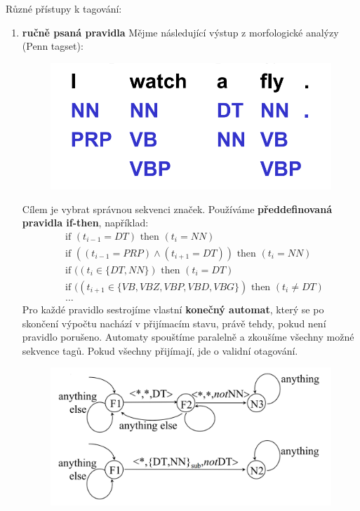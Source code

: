 \documentclass[11pt]{report} %
\numberwithin{equation}{section}
\begin{document}
Různé přístupy k tagování:
\begin{enumerate}
	\item \textbf{ručně psaná pravidla} Mějme následující výstup z morfologické analýzy (Penn tagset):
	\begin{figure}[H]
		\centering
		\includegraphics[scale=1]{img/tag1.png}
	\end{figure}
	Cílem je vybrat správnou sekvenci značek. Používáme \textbf{předdefinovaná pravidla if-then}, například:
		\begin{align*}
			&\text{if }(t_{i-1} = DT)\text{ then }(t_i = NN)\\
			&\text{if }((t_{i-1} = PRP) \wedge (t_{i+1} = DT))\text{ then }(t_i = NN)\\
			&\text{if }((t_{i} \in \{DT,NN\})\text{ then }(t_i = DT)\\
			&\text{if }((t_{i+1} \in \{VB,VBZ,VBP,VBD,VBG\})\text{ then }(t_i \neq DT)\\
			&\dots
		\end{align*}
	Pro každé pravidlo sestrojíme vlastní \textbf{konečný automat}, který se po skončení výpočtu nachází v přijímacím stavu, právě tehdy, pokud není pravidlo porušeno. Automaty spouštíme paralelně a zkoušíme všechny možné sekvence tagů. Pokud všechny přijímají, jde o validní otagování.
	\begin{figure}[H]
		\centering
		\includegraphics[scale=1]{img/tag_automat.png}
	\end{figure}
	

\end{enumerate}
\end{document}
